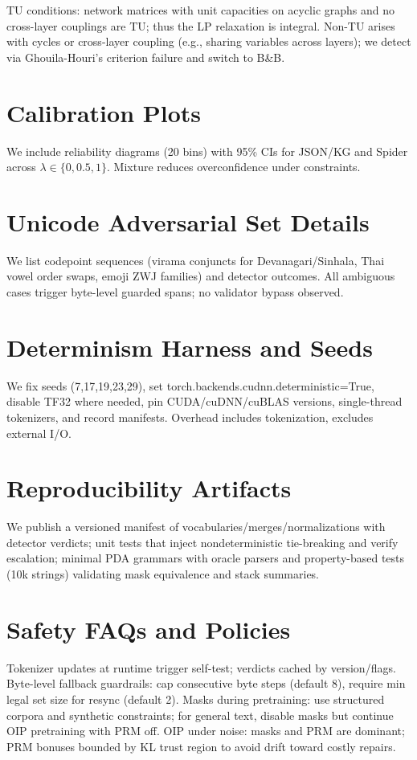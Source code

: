 \documentclass{article}
\begin{document}
TU conditions: network matrices with unit capacities on acyclic graphs and no cross-layer couplings are TU; thus the LP relaxation is integral. Non-TU arises with cycles or cross-layer coupling (e.g., sharing variables across layers); we detect via Ghouila-Houri’s criterion failure and switch to B\&B.

\section{Calibration Plots}
We include reliability diagrams (20 bins) with 95\% CIs for JSON/KG and Spider across $\lambda\in\{0,0.5,1\}$. Mixture reduces overconfidence under constraints.

\section{Unicode Adversarial Set Details}
We list codepoint sequences (virama conjuncts for Devanagari/Sinhala, Thai vowel order swaps, emoji ZWJ families) and detector outcomes. All ambiguous cases trigger byte-level guarded spans; no validator bypass observed.

\section{Determinism Harness and Seeds}
We fix seeds (7,17,19,23,29), set torch.backends.cudnn.deterministic=True, disable TF32 where needed, pin CUDA/cuDNN/cuBLAS versions, single-thread tokenizers, and record manifests. Overhead includes tokenization, excludes external I/O.

\section{Reproducibility Artifacts}
We publish a versioned manifest of vocabularies/merges/normalizations with detector verdicts; unit tests that inject nondeterministic tie-breaking and verify escalation; minimal PDA grammars with oracle parsers and property-based tests (10k strings) validating mask equivalence and stack summaries.

\section{Safety FAQs and Policies}
Tokenizer updates at runtime trigger self-test; verdicts cached by version/flags. Byte-level fallback guardrails: cap consecutive byte steps (default 8), require min legal set size for resync (default 2). Masks during pretraining: use structured corpora and synthetic constraints; for general text, disable masks but continue OIP pretraining with PRM off. OIP under noise: masks and PRM are dominant; PRM bonuses bounded by KL trust region to avoid drift toward costly repairs.
\end{document}

